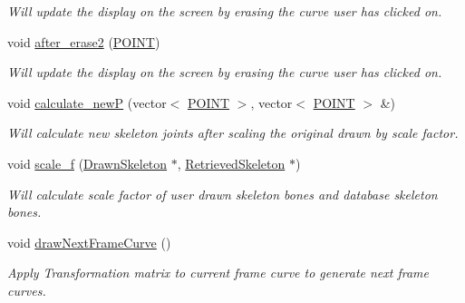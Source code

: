 \begin{DoxyCompactItemize}
\begin{DoxyCompactList}\small\item\em \-Will update the display on the screen by erasing the curve user has clicked on. \end{DoxyCompactList}\item 
\hypertarget{classScribbleArea_a7e0998c697a5b7bfa75e4824f08742e9}{void \hyperlink{classScribbleArea_a7e0998c697a5b7bfa75e4824f08742e9}{after\-\_\-erase2} (\hyperlink{structPOINT}{\-P\-O\-I\-N\-T})}\label{classScribbleArea_a7e0998c697a5b7bfa75e4824f08742e9}

\begin{DoxyCompactList}\small\item\em \-Will update the display on the screen by erasing the curve user has clicked on. \end{DoxyCompactList}\item 
\hypertarget{classScribbleArea_aeb142252b19c4a70dda699b4ceadf682}{void \hyperlink{classScribbleArea_aeb142252b19c4a70dda699b4ceadf682}{calculate\-\_\-new\-P} (vector$<$ \hyperlink{structPOINT}{\-P\-O\-I\-N\-T} $>$, vector$<$ \hyperlink{structPOINT}{\-P\-O\-I\-N\-T} $>$ \&)}\label{classScribbleArea_aeb142252b19c4a70dda699b4ceadf682}

\begin{DoxyCompactList}\small\item\em \-Will calculate new skeleton joints after scaling the original drawn by scale factor. \end{DoxyCompactList}\item 
\hypertarget{classScribbleArea_ac1478bfca3dde7dffe85cca86cd7bc95}{void \hyperlink{classScribbleArea_ac1478bfca3dde7dffe85cca86cd7bc95}{scale\-\_\-f} (\hyperlink{classDrawnSkeleton}{\-Drawn\-Skeleton} $\ast$, \hyperlink{classRetrievedSkeleton}{\-Retrieved\-Skeleton} $\ast$)}\label{classScribbleArea_ac1478bfca3dde7dffe85cca86cd7bc95}

\begin{DoxyCompactList}\small\item\em \-Will calculate scale factor of user drawn skeleton bones and database skeleton bones. \end{DoxyCompactList}\item 
\hypertarget{classScribbleArea_a0dfb29b85be254318a5f3bf27bd548d2}{void \hyperlink{classScribbleArea_a0dfb29b85be254318a5f3bf27bd548d2}{draw\-Next\-Frame\-Curve} ()}\label{classScribbleArea_a0dfb29b85be254318a5f3bf27bd548d2}

\begin{DoxyCompactList}\small\item\em \-Apply \-Transformation matrix to current frame curve to generate next frame curves. \end{DoxyCompactList}\end{DoxyCompactItemize}
